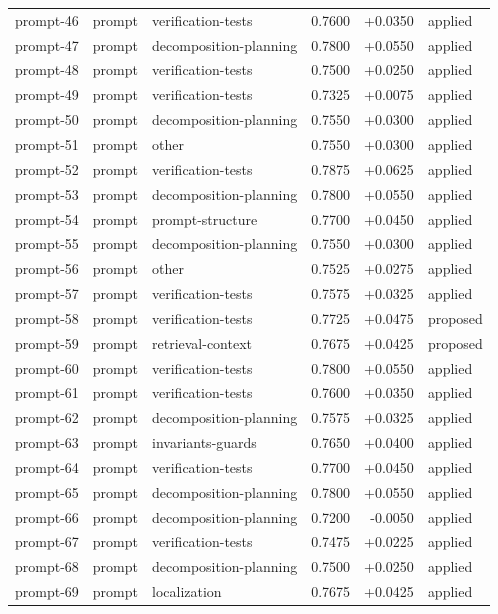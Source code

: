 \begin{center}
\begin{longtable}{llp{5.2cm}rrl}
prompt-46 & prompt & verification-tests & 0.7600 & +0.0350 & applied \\
prompt-47 & prompt & decomposition-planning & 0.7800 & +0.0550 & applied \\
prompt-48 & prompt & verification-tests & 0.7500 & +0.0250 & applied \\
prompt-49 & prompt & verification-tests & 0.7325 & +0.0075 & applied \\
prompt-50 & prompt & decomposition-planning & 0.7550 & +0.0300 & applied \\
prompt-51 & prompt & other & 0.7550 & +0.0300 & applied \\
prompt-52 & prompt & verification-tests & 0.7875 & +0.0625 & applied \\
prompt-53 & prompt & decomposition-planning & 0.7800 & +0.0550 & applied \\
prompt-54 & prompt & prompt-structure & 0.7700 & +0.0450 & applied \\
prompt-55 & prompt & decomposition-planning & 0.7550 & +0.0300 & applied \\
prompt-56 & prompt & other & 0.7525 & +0.0275 & applied \\
prompt-57 & prompt & verification-tests & 0.7575 & +0.0325 & applied \\
prompt-58 & prompt & verification-tests & 0.7725 & +0.0475 & proposed \\
prompt-59 & prompt & retrieval-context & 0.7675 & +0.0425 & proposed \\
prompt-60 & prompt & verification-tests & 0.7800 & +0.0550 & applied \\
prompt-61 & prompt & verification-tests & 0.7600 & +0.0350 & applied \\
prompt-62 & prompt & decomposition-planning & 0.7575 & +0.0325 & applied \\
prompt-63 & prompt & invariants-guards & 0.7650 & +0.0400 & applied \\
prompt-64 & prompt & verification-tests & 0.7700 & +0.0450 & applied \\
prompt-65 & prompt & decomposition-planning & 0.7800 & +0.0550 & applied \\
prompt-66 & prompt & decomposition-planning & 0.7200 & -0.0050 & applied \\
prompt-67 & prompt & verification-tests & 0.7475 & +0.0225 & applied \\
prompt-68 & prompt & decomposition-planning & 0.7500 & +0.0250 & applied \\
prompt-69 & prompt & localization & 0.7675 & +0.0425 & applied \\

\end{longtable}
\end{center}
